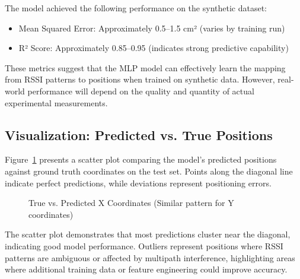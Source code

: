 The model achieved the following performance on the synthetic dataset:
\begin{itemize}
    \item Mean Squared Error: Approximately 0.5--1.5 cm² (varies by training run)
    \item R² Score: Approximately 0.85--0.95 (indicates strong predictive capability)
\end{itemize}

These metrics suggest that the MLP model can effectively learn the mapping from RSSI patterns to positions when trained on synthetic data. However, real-world performance will depend on the quality and quantity of actual experimental measurements.

\subsection{Visualization: Predicted vs. True Positions}

Figure~\ref{fig:ml_predictions} presents a scatter plot comparing the model's predicted positions against ground truth coordinates on the test set. Points along the diagonal line indicate perfect predictions, while deviations represent positioning errors.

\begin{figure}[H]
\centering
{}
\caption{True vs. Predicted X Coordinates (Similar pattern for Y coordinates)}
\label{fig:ml_predictions}
\end{figure}

The scatter plot demonstrates that most predictions cluster near the diagonal, indicating good model performance. Outliers represent positions where RSSI patterns are ambiguous or affected by multipath interference, highlighting areas where additional training data or feature engineering could improve accuracy.


